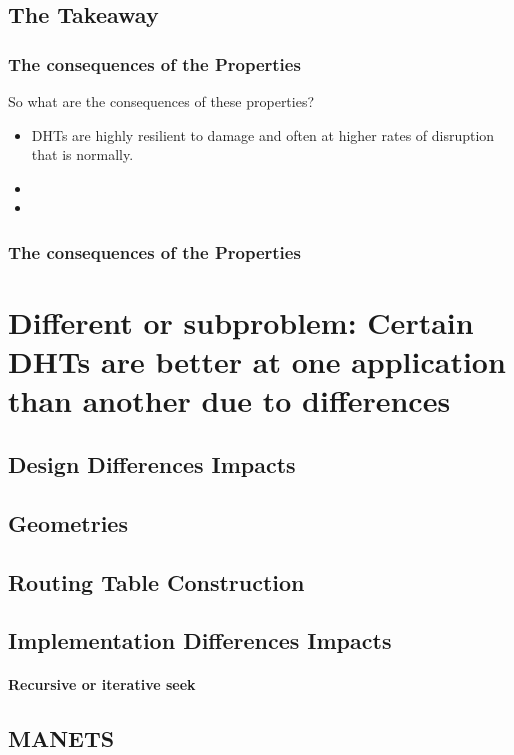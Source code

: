 \documentclass[10pt,letterpaper]{report}
\begin{document}
\subsection{The Takeaway}


\subsubsection{The consequences of the Properties}
So what are the consequences of these properties?
\begin{itemize}
	\item DHTs are highly resilient to damage and often at higher rates of disruption that is normally.
	\item 
	\item 
\end{itemize}


\subsubsection{The consequences of the Properties}


\section{Different or subproblem: Certain DHTs are better at one application than another due to differences}
\subsection{Design Differences Impacts}
\subsection{Geometries}
\subsection{Routing Table Construction}
\subsection{Implementation Differences Impacts}
\paragraph{Recursive or iterative seek}


\subsection{MANETS}
\end{document}
